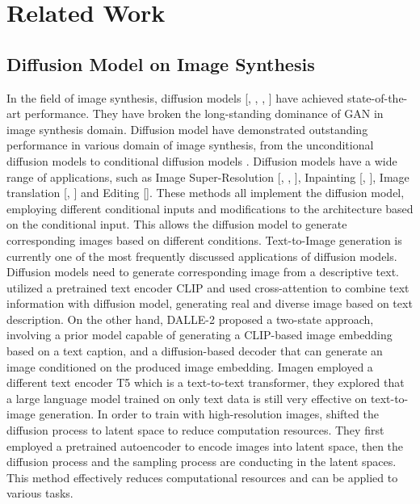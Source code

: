 \chapter{Related Work}
\label{chapter:relatedwork}

\section{Diffusion Model on Image Synthesis}
In the field of image synthesis, diffusion models [\cite{ho2020denoising}, \cite{song2020score}, \cite{mirza2014conditional}, \cite{sohl2015deep}] have achieved state-of-the-art performance. They have broken the long-standing dominance of GAN \cite{goodfellow2020generative} in image synthesis domain. Diffusion model have demonstrated outstanding performance in various domain of image synthesis, from the unconditional diffusion models \cite{ho2020denoising} to conditional diffusion models \cite{dhariwal2021diffusion}. Diffusion models have a wide range of applications, such as Image Super-Resolution [\cite{li2022srdiff}, \cite{saharia2022image}, \cite{rombach2022high}], Inpainting [\cite{rombach2022high}, \cite{saharia2022palette}], Image translation [\cite{ozbey2023unsupervised}, \cite{saharia2022palette}] and Editing [\cite{meng2021sdedit}]. These methods all implement the diffusion model, employing different conditional inputs and modifications to the architecture based on the conditional input. This allows the diffusion model to generate corresponding images based on different conditions. Text-to-Image generation is currently one of the most frequently discussed applications of diffusion models. Diffusion models need to generate corresponding image from a descriptive text. \cite{rombach2022high} utilized a pretrained text encoder CLIP \cite{radford2021learning} and used cross-attention to combine text information with diffusion model, generating real and diverse image based on text description. On the other hand, DALLE-2 \cite{ramesh2022hierarchical} proposed a two-state approach, involving a prior model capable of generating a CLIP-based image embedding based on a text caption, and a diffusion-based decoder that can generate an image conditioned on the produced image embedding. Imagen \cite{saharia2022photorealistic} employed a different text encoder T5 \cite{raffel2020exploring} which is a text-to-text transformer, they explored that a large language model trained on only text data is still very effective on text-to-image generation. In order to train with high-resolution images, \cite{rombach2022high} shifted the diffusion process to latent space to reduce computation resources. They first employed a pretrained autoencoder to encode images into latent space, then the diffusion process and the sampling process are conducting in the latent spaces. This method effectively reduces computational resources and can be applied to various tasks.


